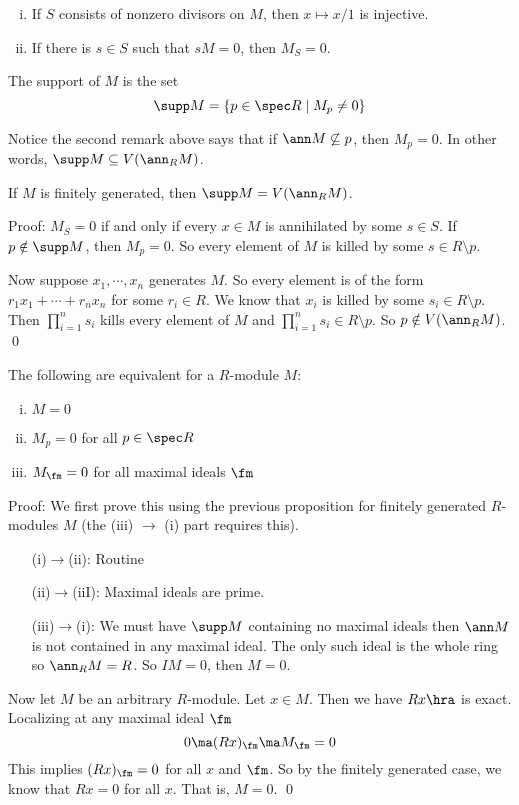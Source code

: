 \begin{rem}
\begin{enumerate}[(i)]
\item If $S$ consists of nonzero divisors on $M$, then $x \mapsto x/1$ is injective.
\item If there is $s \in S$ such that $sM=0$, then $M_S=0$.
\end{enumerate}
\end{rem}

\begin{dfn}[Support]
The support of $M$ is the set 
\[
\supp M=\{p \in \spec R \;|\; M_p \neq 0\}
\]
\end{dfn}

Notice the second remark above says that if $\ann M \not\subseteq p$, then $M_p=0$. In other words, $\supp M \subseteq V(\ann_R M)$. 

\begin{prop}
If $M$ is finitely generated, then $\supp M=V(\ann_R M)$. 
\end{prop}

\noindent Proof: $M_S=0$ if and only if every $x \in M$ is annihilated by some $s \in S$. If $p \notin \supp M$, then $M_p=0$. So every element of $M$ is killed by some $s \in R \setminus p$. 

Now suppose $x_1,\cdots,x_n$ generates $M$. So every element is of the form $r_1x_1+\cdots+r_nx_n$ for some $r_i \in R$. We know that $x_i$ is killed by some $s_i \in R\setminus p$. Then $\prod_{i=1}^n s_i$ kills every element of $M$ and $\prod_{i=1}^n s_i \in R \setminus p$. So $p \notin V(\ann_R M)$. \qed \\

\begin{cor}
The following are equivalent for a $R$-module $M$:
\begin{enumerate}[(i)]
\item $M=0$
\item $M_p=0$ for all $p \in \spec R$
\item $M_{\fm}=0$ for all maximal ideals $\fm$
\end{enumerate}
\end{cor}

\noindent Proof: We first prove this using the previous proposition for finitely generated $R$-modules $M$ (the (iii) $\to$ (i) part requires this). 
\begin{enumerate}
\item[(i)$\to$(ii):] Routine
\item[(ii)$\to$(iiI):] Maximal ideals are prime.
\item[(iii)$\to$(i):] We must have $\supp M$ containing no maximal ideals then $\ann M$ is not contained in any maximal ideal. The only such ideal is the whole ring so $\ann_R M=R$. So $IM=0$, then $M=0$.
\end{enumerate}
Now let $M$ be an arbitrary $R$-module. Let $x \in M$. Then we have $Rx \hra$ is exact. Localizing at any maximal ideal $\fm$
\[
0 \ma (Rx)_{\fm} \ma M_{\fm} =0
\]
This implies $(Rx)_{\fm}=0$ for all $x$ and $\fm$. So by the finitely generated case, we know that $Rx=0$ for all $x$. That is, $M=0$. \qed \\

